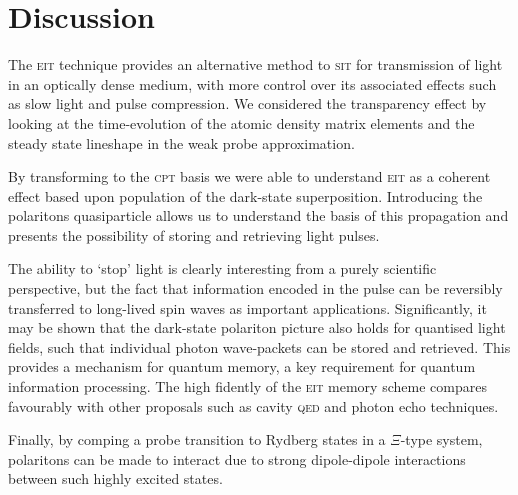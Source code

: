 \section{Discussion}
  \label{sec:polaritons_discussion}

  The \textsc{eit} technique provides an alternative method to \textsc{sit} for
  transmission of light in an optically dense medium, with more control over its
  associated effects such as slow light and pulse compression. We considered the
  transparency effect by looking at the time-evolution of the atomic density
  matrix elements and the steady state lineshape in the weak probe
  approximation.

  By transforming to the \textsc{cpt} basis we were able to understand
  \textsc{eit} as a coherent effect based upon population of the dark-state
  superposition. Introducing the polaritons quasiparticle allows us to
  understand the basis of this propagation and presents the possibility of
  storing and retrieving light pulses.

  The ability to `stop' light is clearly interesting from a purely scientific
  perspective, but the fact that information encoded in the pulse can be
  reversibly transferred to long-lived spin waves as important applications.
  Significantly, it may be shown that the dark-state polariton picture also
  holds for quantised light fields, such that individual photon wave-packets can
  be stored and retrieved\cite{Fleischhauer2000}. This provides a mechanism for
  quantum memory, a key requirement for quantum information
  processing\cite{Lvovsky2009,Zhao2008}. The high fidently of the \textsc{eit}
  memory scheme compares favourably with other proposals such as cavity
  \textsc{qed} and photon echo techniques\cite{Moiseev2011,Kurnit1964}.

  Finally, by comping a probe transition to Rydberg states in a $\Xi$-type
  system, polaritons can be made to interact due to strong dipole-dipole
  interactions between such highly excited states.\cite{Maxwell2013}
